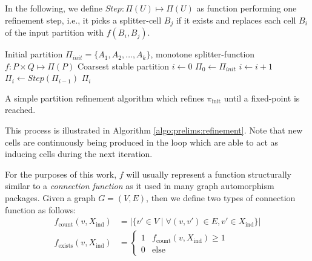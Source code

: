 		In the following, we define $Step: \Pi(U) \mapsto \Pi(U)$ as function performing one refinement step, i.e., it picks a splitter-cell $B_j$ if it exists and replaces each cell $B_i$ of the input partition with $f(B_i, B_j)$.

		\begin{algorithm}[ht!]
			\centering
			\begin{algorithmic}
				\Require Initial partition $\Pi_{init} = \{ A_1, A_2, \ldots, A_k \}$, monotone splitter-function $f: P \times Q \mapsto \Pi(P)$
				\Ensure Coarsest stable partition
				\Statex
					\State $i \gets 0$
					\State $\Pi_0 \gets \Pi_{init}$
					\Repeat
						\State $i \gets i + 1$
						\State $\Pi_i \gets Step(\Pi_{i-1})$
					\State \Return $\Pi_i$
				\EndFunction
			\end{algorithmic}
			\caption{A simple partition refinement algorithm which refines $\pi_{\mathrm{init}}$ until a fixed-point is reached.}
			\label{algo:prelims:refinement}
		\end{algorithm}
		
%		
%		
%		
%		

		
		This process is illustrated in Algorithm \ref{algo:prelims:refinement}. Note that new cells are continuously being produced in the loop which are able to act as inducing cells during the next iteration.
		
		For the purposes of this work, $f$ will usually represent a function structurally similar to a \textit{connection function} as it used in many graph automorphism packages.
		Given a graph $G = (V, E)$, then we define two types of connection function as follows:
		\begin{align}
			f_{\mathrm{count}}(v, X_{\mathrm{ind}}) &= \left| \{ v' \in V \mid \forall (v, v') \in E, v' \in X_{\mathrm{ind}} \} \right| \label{eq:prelims:pref:count} \\
			f_{\mathrm{exists}}(v, X_{\mathrm{ind}}) &= \begin{cases}
				1 & f_{\mathrm{count}}(v, X_{\mathrm{ind}}) \geq 1 \label{eq:prelims:pref:exists} \\
				0 & \mathrm{else}
			\end{cases}
		\end{align}
		
